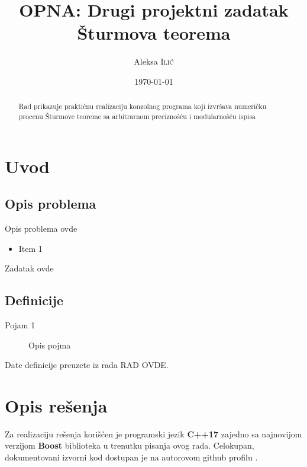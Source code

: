 \documentclass[a4paper,10pt]{article}
\title{OPNA: Drugi projektni zadatak \\ Šturmova teorema} %
\author{Aleksa \textsc{Ilić}} %
\date{\today} %
\begin{document}
\maketitle %

\begin{abstract}
    Rad prikazuje praktičnu realizaciju konzolnog programa koji izvršava numeričku procenu Šturmove teoreme sa arbitrarnom preciznošću i modularnošću ispisa
\end{abstract}


\section{Uvod}
\subsection{Opis problema}

Opis problema ovde

\begin{itemize}
\item Item 1
\end{itemize}

Zadatak ovde

\subsection{Definicije}
\label{definitions}
\begin{description}
\item[Pojam 1] Opis pojma
\end{description}
Date definicije preuzete iz rada RAD OVDE.
 

\section{Opis rešenja}

Za realizaciju rešenja korišćen je programski jezik \textbf{C++17} zajedno sa najnovijom verzijom \textbf{Boost} biblioteka u trenutku pisanja ovog rada. Celokupan, dokumentovani izvorni kod dostupan je na autorovom github profilu \cite{WEBSITE:Github}.
\end{document}
